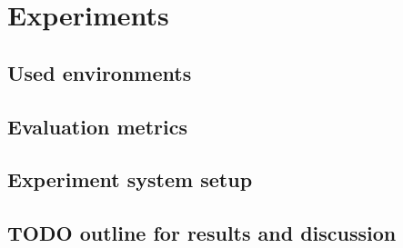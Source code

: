 \chapter{Experiments}\label{chapter:experiments}

\section{Used environments}

\section{Evaluation metrics}

\section{Experiment system setup}

\section{TODO outline for results and discussion}

